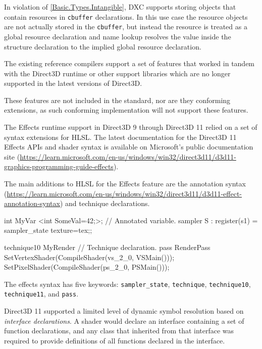 
\p In violation of \ref{Basic.Types.Intangible}, DXC supports storing objects
that contain resources in \texttt{cbuffer} declarations. In this use case the
resource objects are not actually stored in the \texttt{cbuffer}, but instead
the resource is treated as a global resource declaration and name lookup
resolves the value inside the structure declaration to the implied global
resource declaration.


\p The existing reference compilers support a set of features that worked in
tandem with the Direct3D runtime or other support libraries which are no longer
supported in the latest versions of Direct3D.

\p These features are not included in the standard, nor are they conforming
extensions, as such conforming implementation will not support these features.


\p The Effects runtime support in Direct3D 9 through Direct3D 11 relied on a set of
syntax extensions for HLSL. The latest documentation for the Direct3D 11 Effects
APIs and shader syntax is available on Microsoft's public documentation
site (\url{https://learn.microsoft.com/en-us/windows/win32/direct3d11/d3d11-graphics-programming-guide-effects}).

\p The main additions to HLSL for the Effects feature are the annotation
syntax (\url{https://learn.microsoft.com/en-us/windows/win32/direct3d11/d3d11-effect-annotation-syntax})
and technique declarations.

\begin{HLSL}
int MyVar <int SomeVal=42;>; // Annotated variable.
sampler S : register(s1) = sampler_state {texture=tex;};

technique10 MyRender // Technique declaration.
{
	pass RenderPass
	{
		SetVertexShader(CompileShader(vs_2_0, VSMain()));
		SetPixelShader(CompileShader(ps_2_0, PSMain()));
	}
}
\end{HLSL}

\p The effects syntax has five keywords: \texttt{sampler\_state},
\texttt{technique}, \texttt{technique10}, \texttt{technique11}, and
\texttt{pass}.


\p Direct3D 11 supported a limited level of dynamic symbol resolution based on
\textit{interface declarations}. A shader would declare an interface containing
a set of function declarations, and any class that inherited from that interface
was required to provide definitions of all functions declared in the interface.

